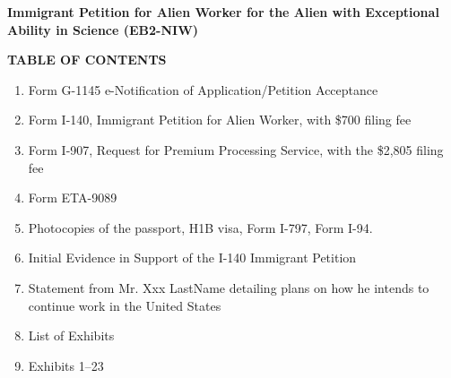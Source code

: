 \documentclass[11pt]{article}
\title{}
\date{}
\begin{document}
\newcommand{\tc}[1]{\textcolor{blue}{#1}}

\vspace*{10em}





\begin{center}
 \Large{\textbf{Immigrant Petition for Alien Worker
for the Alien with Exceptional Ability in Science (EB2-NIW)}}
\end{center}


\vspace*{1em}

\begin{center}
\Large{\textbf{TABLE OF CONTENTS}} 
\end{center}


\begin{enumerate}
 \item Form G-1145 e-Notification of Application/Petition Acceptance
 \item Form I-140, Immigrant Petition for Alien Worker, with \$700 filing fee
 \item Form I-907, Request for Premium Processing Service, with the \$2,805 filing fee
 \item Form ETA-9089
 \item Photocopies of the passport, H1B visa, Form I-797, Form I-94.
 \item Initial Evidence in Support of the I-140 Immigrant Petition
 \item Statement from Mr. Xxx LastName detailing plans on how he intends to continue work in the United States
 \item List of Exhibits
 \item Exhibits 1--23
\end{enumerate}


\pagebreak


\end{document}
